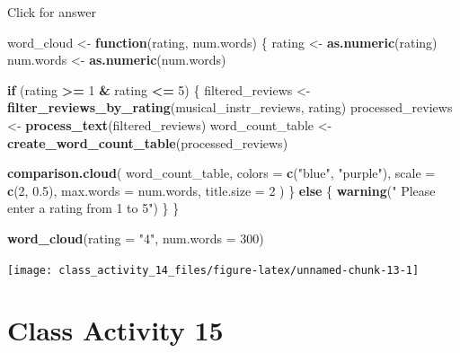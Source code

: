 \documentclass[
]{book}
\newenvironment{Shaded}{\begin{snugshade}}{\end{snugshade}}
\newcommand{\AttributeTok}[1]{\textcolor[rgb]{0.13,0.29,0.53}{#1}}
\newcommand{\ControlFlowTok}[1]{\textcolor[rgb]{0.13,0.29,0.53}{\textbf{#1}}}
\newcommand{\DecValTok}[1]{\textcolor[rgb]{0.00,0.00,0.81}{#1}}
\newcommand{\FloatTok}[1]{\textcolor[rgb]{0.00,0.00,0.81}{#1}}
\newcommand{\FunctionTok}[1]{\textcolor[rgb]{0.13,0.29,0.53}{\textbf{#1}}}
\newcommand{\NormalTok}[1]{#1}
\newcommand{\OtherTok}[1]{\textcolor[rgb]{0.56,0.35,0.01}{#1}}
\newcommand{\SpecialCharTok}[1]{\textcolor[rgb]{0.81,0.36,0.00}{\textbf{#1}}}
\newcommand{\StringTok}[1]{\textcolor[rgb]{0.31,0.60,0.02}{#1}}
\begin{document}
Click for answer

\begin{Shaded}
\begin{Highlighting}[]
\NormalTok{word\_cloud }\OtherTok{\textless{}{-}} \ControlFlowTok{function}\NormalTok{(rating, num.words) \{}
\NormalTok{  rating }\OtherTok{\textless{}{-}} \FunctionTok{as.numeric}\NormalTok{(rating)}
\NormalTok{  num.words }\OtherTok{\textless{}{-}} \FunctionTok{as.numeric}\NormalTok{(num.words)}
  
  \ControlFlowTok{if}\NormalTok{ (rating }\SpecialCharTok{\textgreater{}=} \DecValTok{1} \SpecialCharTok{\&}\NormalTok{ rating }\SpecialCharTok{\textless{}=} \DecValTok{5}\NormalTok{) \{}
\NormalTok{    filtered\_reviews }\OtherTok{\textless{}{-}} \FunctionTok{filter\_reviews\_by\_rating}\NormalTok{(musical\_instr\_reviews, rating)}
\NormalTok{    processed\_reviews }\OtherTok{\textless{}{-}} \FunctionTok{process\_text}\NormalTok{(filtered\_reviews)}
\NormalTok{    word\_count\_table }\OtherTok{\textless{}{-}} \FunctionTok{create\_word\_count\_table}\NormalTok{(processed\_reviews)}
    
    \FunctionTok{comparison.cloud}\NormalTok{(}
\NormalTok{      word\_count\_table,}
      \AttributeTok{colors =} \FunctionTok{c}\NormalTok{(}\StringTok{"blue"}\NormalTok{, }\StringTok{"purple"}\NormalTok{),}
      \AttributeTok{scale =} \FunctionTok{c}\NormalTok{(}\DecValTok{2}\NormalTok{, }\FloatTok{0.5}\NormalTok{),}
      \AttributeTok{max.words =}\NormalTok{ num.words,}
      \AttributeTok{title.size =} \DecValTok{2}
\NormalTok{    )}
\NormalTok{  \} }\ControlFlowTok{else}\NormalTok{ \{}
    \FunctionTok{warning}\NormalTok{(}\StringTok{" Please enter a rating from 1 to 5"}\NormalTok{)}
\NormalTok{  \}}
\NormalTok{\}}

\FunctionTok{word\_cloud}\NormalTok{(}\AttributeTok{rating =} \StringTok{"4"}\NormalTok{, }\AttributeTok{num.words =} \DecValTok{300}\NormalTok{)}
\end{Highlighting}
\end{Shaded}

\texttt{[image: class\_activity\_14\_files/figure-latex/unnamed-chunk-13-1]}

\hypertarget{class-activity-15}{%
\chapter{Class Activity 15}\label{class-activity-15}}
\end{document}
